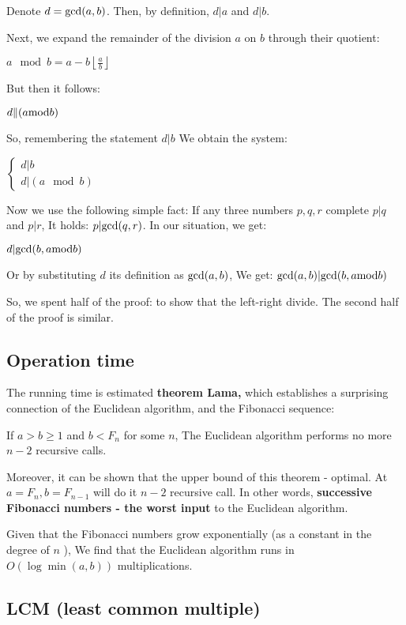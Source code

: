 Denote $d = {\rm gcd} (a, b)$. Then, by definition, $d | a$ and $d | b$.

Next, we expand the remainder of the division $a$ on $b$ through their quotient:

$a\mod b=a-b\left\lfloor \frac{a}{b}\right\rfloor$

But then it follows:

$d \| (a {\rm { mod }} b)$

So, remembering the statement $d | b$ We obtain the system:

$\begin{cases}
d|b\\
d|(a\mod b)
\end{cases}$

Now we use the following simple fact: If any three numbers $p, q, r$ complete $p | q$ and $p | r$, It holds: $p | {\rm gcd} (q, r)$. In our situation, we get:

$d | {\rm gcd} (b, a {\rm { mod }} b)$

Or by substituting $d$ its definition as ${\rm gcd} (a, b)$, We get:
${\rm gcd} (a, b) | {\rm gcd} (b, a {\rm { mod }} b)$

So, we spent half of the proof: to show that the left-right divide. The second half of the proof is similar.

\subsection{ Operation time }

The running time is estimated \textbf{theorem Lama,} which establishes a surprising connection of the Euclidean algorithm, and the Fibonacci sequence:

If $a> b \ge 1$ and $b <F_n$ for some $n$, The Euclidean algorithm performs no more $n-2$ recursive calls.

Moreover, it can be shown that the upper bound of this theorem - optimal. At $a = F_n, b = F_ {n-1}$ will do it $n-2$ recursive call. In other words, \textbf{successive Fibonacci numbers - the worst input} to the Euclidean algorithm.

Given that the Fibonacci numbers grow exponentially (as a constant in the degree of $n$ ), We find that the Euclidean algorithm runs in $O (\log \min (a, b))$ multiplications.

\subsection{ LCM (least common multiple) }

